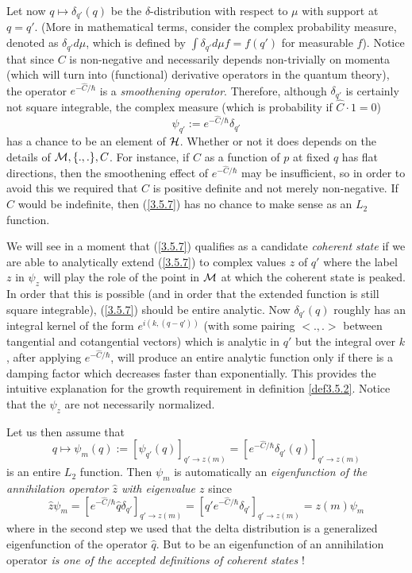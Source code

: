 \documentclass[12pt]{report}
\def\be{\begin{equation}}
\def\ee{\end{equation}}
\begin{document}
Let now $q\mapsto \delta_{q'}(q)$ be the $\delta$-distribution with 
respect to $\mu$ with support at $q=q'$. (More in mathematical terms,
consider the complex probability measure, denoted as  
$\delta_{q'}d\mu$, which is defined by $\int \delta_{q'} d\mu f=f(q')$ 
for measurable $f$).
Notice that since $C$ is non-negative and necessarily depends 
non-trivially on momenta (which will turn into (functional) derivative 
operators in the quantum theory), the operator $e^{-\hat{C}/\hbar}$
is a {\it smoothening operator}. Therefore, although $\delta_{q'}$
is certainly not square integrable, the complex measure (which
is probability if $\hat{C}\cdot 1=0$) 
\be \label{3.5.7}
\psi_{q'}:=e^{-\hat{C}/\hbar}\delta_{q'}
\ee
has a chance to be an element of $\cal H$. Whether or not it does depends 
on the details of ${\cal M},\{.,.\},C$. For instance, if $C$ as a function
of $p$ at fixed $q$ has flat directions, then the smoothening effect
of $e^{-\hat{C}/\hbar}$ may be insufficient, so in order to avoid this
we required that $C$ is positive definite and not merely non-negative.
If $C$ would be indefinite, then (\ref{3.5.7}) has no chance to make sense 
as an $L_2$ function. 

We will see in a moment that (\ref{3.5.7}) qualifies as a candidate {\it
coherent state} if we are able to analytically extend (\ref{3.5.7}) to 
complex 
values $z$ of $q'$ where the label $z$ in $\psi_z$ will play the role
of the point in $\cal M$ at which the coherent state is peaked. In 
order that this is possible (and in order that the extended function is 
still square integrable), (\ref{3.5.7}) should be entire analytic.
Now $\delta_{q'}(q)$ roughly has an integral kernel of the form 
$e^{i(k,(q-q'))}$ (with some pairing $<.,.>$ between tangential and 
cotangential vectors) which is analytic in $q'$ but the integral over $k$,
after applying $e^{-\hat{C}/\hbar}$,
will produce an entire analytic function only if there is a damping factor 
which decreases faster than exponentially. This provides the intuitive 
explanation for the growth requirement in definition \ref{def3.5.2}.
Notice that the $\psi_z$ are not necessarily normalized.

Let us then assume that 
\be \label{3.5.8}
q\mapsto \psi_m(q):=[\psi_{q'}(q)]_{q'\to z(m)}=
[e^{-\hat{C}/\hbar}\delta_{q'}(q)]_{q'\to z(m)}
\ee
is an entire $L_2$ function. Then $\psi_m$ is automatically an 
{\it eigenfunction of the annihilation operator $\hat{z}$ with eigenvalue
$z$} since 
\be \label{3.5.9}
\hat{z}\psi_m=[e^{-\hat{C}/\hbar}\hat{q}\delta_{q'}]_{q'\to z(m)} 
=[q' e^{-\hat{C}/\hbar}\delta_{q'}]_{q'\to z(m)}=z(m)\psi_m
\ee
where in the second step we used that the delta distribution is a 
generalized eigenfunction of the operator $\hat{q}$. But to be an 
eigenfunction of an annihilation operator {\it is one of the accepted 
definitions of coherent states} ! 
\end{document}
